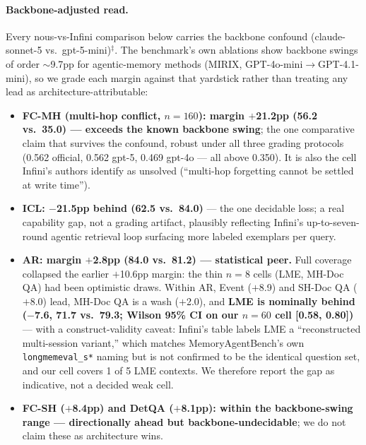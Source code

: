 \documentclass{article}
\newcommand{\nous}{\textsf{nous}}
\newcommand{\mab}{MemoryAgentBench}
\begin{document}
\paragraph{Backbone-adjusted read.} Every \nous{}-vs-Infini comparison below
carries the backbone confound (claude-sonnet-5 vs.\ gpt-5-mini)$^{\ddagger}$.
The benchmark's own ablations show backbone swings of order $\sim$9.7pp for
agentic-memory methods (MIRIX, GPT-4o-mini$\to$GPT-4.1-mini), so we grade
each margin against that yardstick rather than treating any lead as
architecture-attributable:

\begin{itemize}
  \item \textbf{FC-MH (multi-hop conflict, $n{=}160$): margin $+$21.2pp
        (56.2 vs.\ 35.0) --- exceeds the known backbone swing}; the one
        comparative claim that survives the confound, robust under all three
        grading protocols (0.562 official, 0.562 gpt-5, 0.469 gpt-4o --- all
        above 0.350). It is also the cell Infini's authors identify as unsolved
        (``multi-hop forgetting cannot be settled at write time'').
  \item \textbf{ICL: $-$21.5pp behind (62.5 vs.\ 84.0)} --- the one
        decidable loss; a real capability gap, not a grading artifact,
        plausibly reflecting Infini's up-to-seven-round agentic retrieval
        loop surfacing more labeled exemplars per query.
  \item \textbf{AR: margin $+$2.8pp (84.0 vs.\ 81.2) --- statistical peer.}
        Full coverage collapsed the earlier $+$10.6pp margin: the thin
        $n{=}8$ cells (LME, MH-Doc QA) had been optimistic draws. Within AR,
        Event ($+$8.9) and SH-Doc QA ($+$8.0) lead, MH-Doc QA is a wash
        ($+$2.0), and \textbf{LME is nominally behind ($-$7.6, 71.7 vs.\
        79.3; Wilson 95\% CI on our $n{=}60$ cell [0.58, 0.80])} --- with a
        construct-validity caveat: Infini's table labels LME a
        ``reconstructed multi-session variant,'' which matches \mab{}'s own
        \texttt{longmemeval\_s*} naming but is not confirmed to be the
        identical question set, and our cell covers 1 of 5 LME contexts. We
        therefore report the gap as indicative, not a decided weak cell.
  \item \textbf{FC-SH ($+$8.4pp) and DetQA ($+$8.1pp): within the
        backbone-swing range --- directionally ahead but
        backbone-undecidable}; we do not claim these as architecture wins.
\end{itemize}
\end{document}
